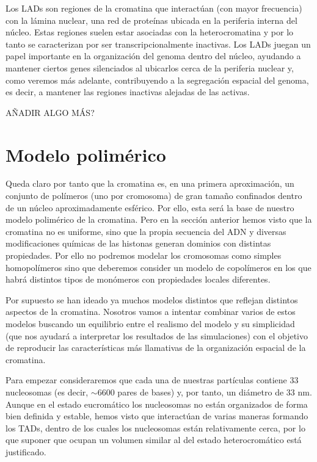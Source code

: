 Los LADs son regiones de la cromatina que interactúan (con mayor frecuencia) con la lámina nuclear, una red de proteínas ubicada en la periferia interna del núcleo. Estas regiones suelen estar asociadas con la heterocromatina y por lo tanto se caracterizan por ser transcripcionalmente inactivas. Los LADs juegan un papel importante en la organización del genoma dentro del núcleo, ayudando a mantener ciertos genes silenciados al ubicarlos cerca de la periferia nuclear y, como veremos más adelante, contribuyendo a la segregación espacial del genoma, es decir, a mantener las regiones inactivas alejadas de las activas.

AÑADIR ALGO MÁS?

\section{Modelo polimérico}

Queda claro por tanto que la cromatina es, en una primera aproximación, un conjunto de polímeros (uno por cromosoma) de gran tamaño confinados dentro de un núcleo aproximadamente esférico. Por ello, esta será la base de nuestro modelo polimérico de la cromatina. Pero en la sección anterior hemos visto que la cromatina no es uniforme, sino que la propia secuencia del ADN y diversas modificaciones químicas de las histonas generan dominios con distintas propiedades. Por ello no podremos modelar los cromosomas como simples homopolímeros sino que deberemos consider un modelo de copolímeros en los que habrá distintos tipos de monómeros con propiedades locales diferentes.

Por supuesto se han ideado ya muchos modelos distintos que reflejan distintos aspectos de la cromatina. Nosotros vamos a intentar combinar varios de estos modelos buscando un equilibrio entre el realismo del modelo y su simplicidad (que nos ayudará a interpretar los resultados de las simulaciones) con el objetivo de reproducir las características más llamativas de la organización espacial de la cromatina.

Para empezar consideraremos que cada una de nuestras partículas contiene 33 nucleosomas (es decir, $\sim6600$ pares de bases) y, por tanto, un diámetro de 33 nm. Aunque en el estado eucromático los nucleosomas no están organizados de forma bien definida y estable, hemos visto que interactúan de varias maneras formando los TADs, dentro de los cuales los nucleosomas están relativamente cerca, por lo que suponer que ocupan un volumen similar al del estado heterocromático está justificado.

